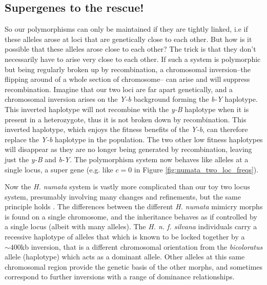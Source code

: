 \subsection{Supergenes to the rescue!} \label{Section:super_genes}

So our polymorphisms can only be maintained if they are tightly linked, i.e if these alleles arose at loci that are genetically close to each other. But how is it possible that these alleles arose close to each other? The trick is that they don't necessarily have to arise very close to each other. If such a system is polymorphic but being regularly broken up by recombination, a chromosomal inversion--the flipping around of a whole section of chromosome-- can arise and will suppress recombination. Imagine that our two loci are far apart genetically, and a chromosomal inversion arises on the {\it Y-b}  background forming the {\it b-Y} haplotype. This inverted haplotype will not recombine with the {\it y-B} haplotype when it is present in a heterozygote, thus it is not broken down by recombination. This inverted haplotype, which enjoys the fitness benefits of the {\it Y-b}, can therefore replace the {\it Y-b} haplotype in the population. The two other low fitness haplotypes will disappear as they are no longer being generated by recombination, leaving just the {\it y-B} and {\it b-Y}. 
  The polymorphism system now behaves like alleles at a single locus, a super gene  (e.g. like $c=0$ in Figure \ref{fig:numata_two_loc_freqs}).

  Now the {\it H. numata} system is vastly more complicated than our toy two locus system, presumably involving many changes and refinements, but the same principle holds \citep{joron2011chromosomal}. The differences between the different {\it H. numata} mimicry morphs is found on a single chromosome, and the inheritance behaves as if controlled by a single locus (albeit with many alleles).  The {\it H. n. f. silvana} individuals carry a recessive haplotype of alleles that which is known to be locked together by a $\sim 400$kb inversion, that is a different chromosomal orientation from the {\it bicoloratus} allele (haplotype) which acts as a dominant allele. Other alleles at this same chromosomal region provide the genetic basis of the other morphs, and sometimes correspond to further inversions with a range of dominance relationships. 


